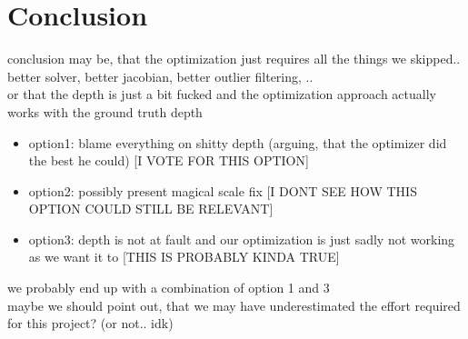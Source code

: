 \chapter{Conclusion}
    conclusion may be, that the optimization just requires all the things we skipped.. better solver, better jacobian, better outlier filtering, ..\\
    or that the depth is just a bit fucked and the optimization approach actually works with the ground truth depth
    \begin{itemize}
        \item option1: blame everything on shitty depth (arguing, that the optimizer did the best he could) [I VOTE FOR THIS OPTION]
        \item option2: possibly present magical scale fix [I DONT SEE HOW THIS OPTION COULD STILL BE RELEVANT]
        \item option3: depth is not at fault and our optimization is just sadly not working as we want it to [THIS IS PROBABLY KINDA TRUE]
    \end{itemize}
    we probably end up with a combination of option 1 and 3\\
    maybe we should point out, that we may have underestimated the effort required for this project? (or not.. idk)